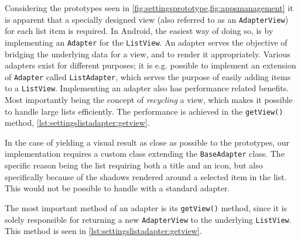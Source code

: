 Considering the prototypes seen in \cref{fig:settingsprototype,fig:appsmanagement} it is apparent that a specially designed view (also referred to as an \lstinline|AdapterView|) for each list item is required.
In Android, the easiest way of doing so, is by implementing an \lstinline|Adapter| for the \lstinline|ListView|.
An adapter serves the objective of bridging the underlying data for a view, and to render it appropriately.
Various adapters exist for different purposes; it is e.g. possible to implement an extension of \lstinline|Adapter| called \lstinline|ListAdapter|, which serves the purpose of easily adding items to a \lstinline|ListView|.
Implementing an adapter also has performance related benefits.
Most importantly being the concept of \textit{recycling} a view, which makes it possible to handle large lists efficiently\cite{listViewsPerformance}. The performance is achieved in the \lstinline|getView()| method, \cref{lst:settingslistadapter:getview}.

In the case of yielding a visual result as close as possible to the prototypes, our implementation requires a custom class extending the \lstinline|BaseAdapter| class.
The specific reason being the list requiring both a title and an icon, but also specifically because of the shadows rendered around a selected item in the list.
This would not be possible to handle with a standard adapter.

The most important method of an adapter is its \lstinline|getView()| method, since it is solely responsible for returning a new \lstinline|AdapterView| to the underlying \lstinline|ListView|.
This method is seen in \cref{lst:settingslistadapter:getview}.

